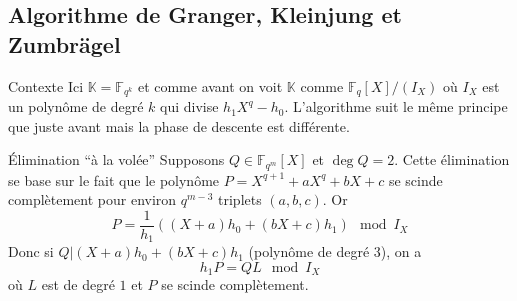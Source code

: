 \documentclass[xcolor=x11names,compress]{beamer}
\theoremstyle{break}
\theoremstyle{sc}
\theoremstyle{definition}
\theoremstyle{remark}
\begin{document}
\subsection{Algorithme de Granger, Kleinjung et Zumbrägel}

\begin{frame}{Contexte}
  Ici $\mathbb{K}=\mathbb{F}_{q^k}$ et comme avant on voit $\mathbb{K}$ comme
  $\mathbb{F}_q[X]/(I_X)$ où $I_X$ est un polynôme de degré $k$ qui divise
  $h_1X^q-h_0$. L'algorithme suit le même principe que juste avant mais la phase
  de descente est différente. 
\end{frame}

\begin{frame}{Élimination ``à la volée''}
  Supposons $Q\in \mathbb{F}_{q^m}[X]$ et $\deg Q = 2$. Cette élimination se base
  sur le fait que le polynôme $P = X^{q+1}+aX^q+bX+c$ se scinde complètement pour
  environ $q^{m-3}$ triplets $(a, b, c)$. Or 
  \[
    P = \frac{1}{h_1}((X+a)h_0 + (bX+c)h_1)\mod I_X
  \]
  Donc si $Q| (X+a)h_0 + (bX+c)h_1$ (polynôme de degré $3$), on a 
  \[
    h_1P=QL \mod I_X
  \]
  où $L$ est de degré $1$ et $P$ se scinde complètement.

\end{frame}

\end{document}

